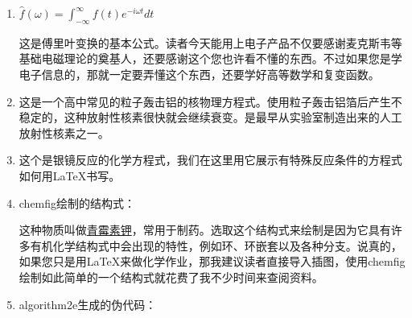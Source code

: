 \begin{enumerate}

\item $ \hat{f}(\omega)=\int^{\infty}_{-\infty}f(t)e^{-i\omega t}dt $

这是傅里叶变换的基本公式。读者今天能用上电子产品不仅要感谢麦克斯韦等基础电磁理论的奠基人，还要感谢这个您也许看不懂的东西。不过如果您是学电子信息的，那就一定要弄懂这个东西，还要学好高等数学和复变函数。

\item {}

这是一个高中常见的\textalpha 粒子轰击铝的核物理方程式。使用\textalpha 粒子轰击铝箔后产生不稳定的，这种放射性核素很快就会继续衰变。是最早从实验室制造出来的人工放射性核素之一。

\item {}

这个是银镜反应的化学方程式，我们在这里用它展示有特殊反应条件的方程式如何用\LaTeX 书写。

\item chemfig绘制的结构式：

 

这种物质叫做\href{https://www.chem960.com/cas/113984/}{青霉素钾}，常用于制药。选取这个结构式来绘制是因为它具有许多有机化学结构式中会出现的特性，例如环、环嵌套以及各种分支。说真的，如果您只是用\LaTeX 来做化学作业，那我建议读者直接导入插图，使用chemfig绘制如此简单的一个结构式就花费了我不少时间来查阅资料。

\item algorithm2e生成的伪代码：

\begin{algorithm}[H]
	
	
	
	\SetAlgoNoLine
	
\end{algorithm}


\end{enumerate}
